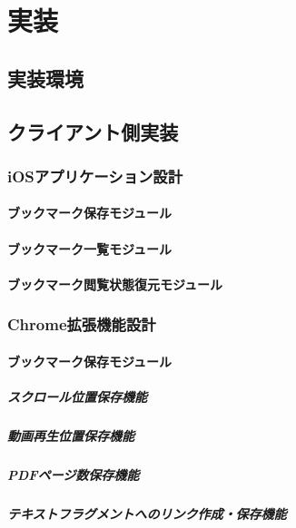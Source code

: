 \chapter{実装}
\label{chap:implementation}

\section{実装環境}
\section{クライアント側実装}
\subsection{iOSアプリケーション設計}
\subsubsection{ブックマーク保存モジュール}
\subsubsection{ブックマーク一覧モジュール}
\subsubsection{ブックマーク閲覧状態復元モジュール}

\subsection{Chrome拡張機能設計}
\subsubsection{ブックマーク保存モジュール}
\paragraph{スクロール位置保存機能}
\paragraph{動画再生位置保存機能}
\paragraph{PDFページ数保存機能}
\paragraph{テキストフラグメントへのリンク作成・保存機能}


